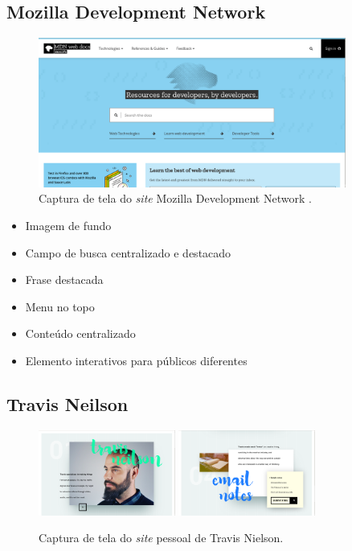 \subsection{Mozilla Development Network }\label{mdn}

\begin{figure}[!htbp]
\centering
\caption{\label{fig-mdn}Captura de tela do \emph{site} Mozilla Development Network .}
\includegraphics[width=0.9\textwidth]{images/tendencias/mdn.png}
\end{figure}

\begin{itemize}
\tightlist
\item
  Imagem de fundo
\item
  Campo de busca centralizado e destacado
\item
  Frase destacada
\item
  Menu no topo
\item
  Conteúdo centralizado
\item
  Elemento interativos para públicos diferentes
\end{itemize}

\subsection{Travis Neilson}\label{travis-neilson}

\begin{figure}[!htbp]
\centering
\caption{\label{fig-travis}Captura de tela do \emph{site} pessoal de Travis Nielson.}
\includegraphics[width=0.4\textwidth]{images/tendencias/travis.png} \includegraphics[width=0.4\textwidth]{images/tendencias/travis2.png}
\end{figure}

